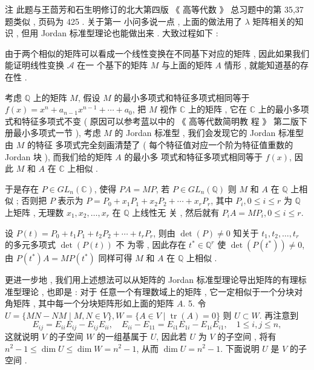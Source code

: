 \documentclass[10pt]{article}
\begin{document}
 注   此题与王茴芳和石生明修订的北大第四版 《 高等代数 》 总习题中的第  35,37  题类似 ,  页码为  425 .  关于第一   小问多说一点 ,  上面的做法用了  $\lambda$  矩阵相关的知识 ,  但用  Jordan  标准型理论也能做出来 .  大致过程如下 :

 由于两个相似的矩阵可以看成一个线性变换在不同基下对应的矩阵 ,  因此如果我们能证明线性变换  $\mathcal{A}$  在一   个基下的矩阵  $M$  与上面的矩阵  $A$  情形 ,  就能知道基的存在性 .

 考虑  $\mathbb{Q}$  上的矩阵  $M$,  假设  $M$  的最小多项式和特征多项式相同等于  $f(x)=x^{n}+a_{n-1} x^{n-1}+\cdots+a_{0}$,  把  $M$  视作  $\mathbb{C}$  上的矩阵 ,  它在  $\mathbb{C}$  上的最小多项式和特征多项式不变  ( 原因可以参考蓝以中的 《 高等代数简明教   程 》 第二版下册最小多项式一节 ),  考虑  $M$  的  Jordan  标准型 ,  我们会发现它的  Jordan  标准型由  $M$  的特征   多项式完全刻画清楚了  ( 每个特征值对应一个阶为特征值重数的  Jordan  块 ),  而我们给的矩阵  $A$  的最小多   项式和特征多项式相同等于  $f(x)$,  因此  $M$  和  $A$  在  $\mathbb{C}$  上相似 .

 于是存在  $P \in G L_{n}(\mathbb{C})$,  使得  $P A=M P$,  若  $P \in G L_{n}(\mathbb{Q})$  则  $M$  和  $A$  在  $\mathbb{Q}$  上相似 ;  否则把  $P$  表示为  $P=P_{0}+x_{1} P_{1}+x_{2} P_{2}+\cdots+x_{r} P_{r}$,  其中  $P_{i}, 0 \leqslant i \leqslant r$  为  $\mathbb{Q}$  上矩阵 ,  无理数  $x_{1}, x_{2}, \ldots, x_{r}$  在  $\mathbb{Q}$  上线性无   关 ,  然后就有  $P_{i} A=M P_{i}, 0 \leqslant i \leqslant r$.

 设  $P(t)=P_{0}+t_{1} P_{1}+t_{2} P_{2}+\cdots+t_{r} P_{r}$,  则由  $\operatorname{det}(P) \neq 0$  知关于  $t_{1}, t_{2}, \ldots, t_{r}$  的多元多项式  $\operatorname{det}(P(t))$  不   为零 ,  因此存在  $t^{*} \in \mathbb{Q}^{r}$  使  $\operatorname{det}\left(P\left(t^{*}\right)\right) \neq 0$,  由  $P\left(t^{*}\right) A=M P\left(t^{*}\right)$  同样可得  $M$  和  $A$  在  $\mathbb{Q}$  上相似 .

 更进一步地 ,  我们用上述想法可以从矩阵的  Jordan  标准型理论导出矩阵的有理标准型理论 ,  也即是 :  对于   任意一个有理数域上的矩阵 ,  它一定相似于一个分块对角矩阵 ,  其中每一个分块矩阵形如上面的矩阵  $A$. 5.  令  $U=\{M N-N M \mid M, N \in V\}, W=\{A \in V \mid \operatorname{tr}(A)=0\}$  则  $U \subset W$.  再注意到 
$$
E_{i j}=E_{i i} E_{i j}-E_{i j} E_{i i}, \quad E_{i i}-E_{11}=E_{i 1} E_{1 i}-E_{1 i} E_{i 1}, \quad 1 \leqslant i, j \leqslant n,
$$
 这就说明  $V$  的子空间  $W$  的一组基属于  $U$,  因此若  $U$  为  $V$  的子空间 ,  将有  $n^{2}-1 \leqslant \operatorname{dim} U \leqslant \operatorname{dim} W=n^{2}-1$,  从而  $\operatorname{dim} U=n^{2}-1$.  下面说明  $U$  是  $V$  的子空间 .
\end{document}
